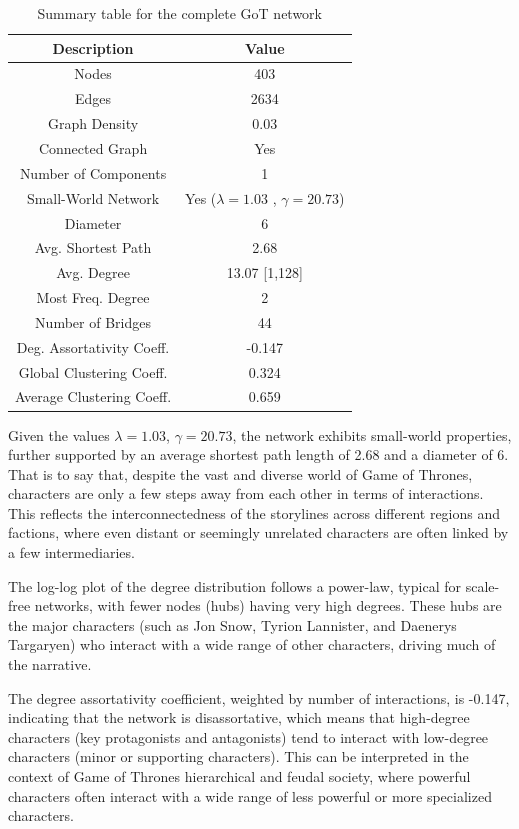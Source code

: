 \documentclass[10pt,twocolumn,letterpaper]{article}
\begin{document}
\begin{table}[!h]
    \centering
    \small
    \begin{tabular}{c|c}
        Description & Value  \\
        \hline
        Nodes & 403\\
        Edges & 2634 \\
        Graph Density & 0.03 \\
        Connected Graph & Yes \\
        Number of Components & 1 \\
        Small-World Network & Yes ($\lambda=1.03$ , $\gamma=20.73$) \\
        Diameter & 6 \\
        Avg. Shortest Path & 2.68 \\
        Avg. Degree & 13.07 [1,128] \\
        Most Freq. Degree & 2 \\
        Number of Bridges & 44 \\
        Deg. Assortativity Coeff. & -0.147\\
        Global Clustering Coeff. & 0.324 \\
        Average Clustering Coeff. & 0.659 \\
        \hline 
    \end{tabular}
    \vspace{0.2cm}
    \caption{Summary table for the complete GoT network}
    \label{tab:my_label}
\end{table} 

Given the values $\lambda=1.03$, $\gamma=20.73$, the network exhibits small-world properties, further supported by an average shortest path length of 2.68 and a diameter of 6. That is to say that, despite the vast and diverse world of Game of Thrones, characters are only a few steps away from each other in terms of interactions. This reflects the interconnectedness of the storylines across different regions and factions, where even distant or seemingly unrelated characters are often linked by a few intermediaries.

The log-log plot of the degree distribution follows a power-law, typical for scale-free networks, with fewer nodes (hubs) having very high degrees. These hubs are the major characters (such as Jon Snow, Tyrion Lannister, and Daenerys Targaryen) who interact with a wide range of other characters, driving much of the narrative. 

The degree assortativity coefficient, weighted by number of interactions, is -0.147, indicating that the network is disassortative, which means that high-degree characters (key protagonists and antagonists) tend to interact with low-degree characters (minor or supporting characters). This can be interpreted in the context of Game of Thrones hierarchical and feudal society, where powerful characters often interact with a wide range of less powerful or more specialized characters.
\end{document}
